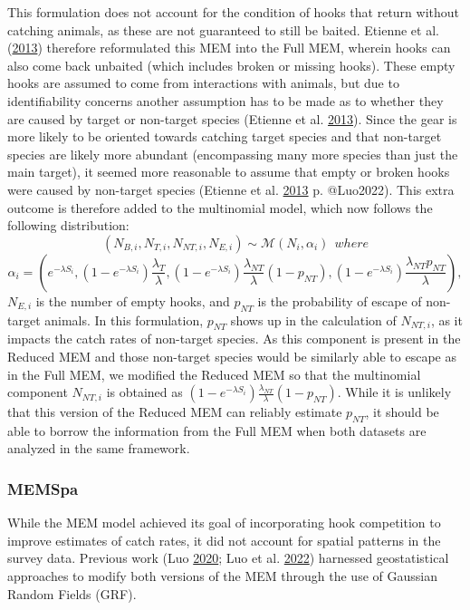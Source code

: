 \documentclass[12pt]{article}\usepackage[]{graphicx}\usepackage[]{color}
\begin{document}
This formulation does not account for the condition of hooks that return without catching animals, as these are not guaranteed to still be baited. Etienne et al. (\protect\hyperlink{ref-Etienne2013}{2013}) therefore reformulated this MEM into the Full MEM, wherein hooks can also come back unbaited (which includes broken or missing hooks). These empty hooks are assumed to come from interactions with animals, but due to identifiability concerns another assumption has to be made as to whether they are caused by target or non-target species (Etienne et al. \protect\hyperlink{ref-Etienne2013}{2013}). Since the gear is more likely to be oriented towards catching target species and that non-target species are likely more abundant (encompassing many more species than just the main target), it seemed more reasonable to assume that empty or broken hooks were caused by non-target species (Etienne et al. \protect\hyperlink{ref-Etienne2013}{2013} p. @Luo2022). This extra outcome is therefore added to the multinomial model, which now follows the following distribution:
\begin{equation}
(N_{B,i},N_{T,i},N_{NT,i},N_{E,i}) \sim \mathcal{M}(N_i,\alpha_i) \ \ where
\end{equation} \begin{equation}
\alpha_i = (e^{-\lambda S_i},(1-e^{-\lambda S_i})\frac{\lambda_T}{\lambda},(1-e^{-\lambda S_i})\frac{\lambda_{NT}}{\lambda}(1-p_{NT}),(1-e^{-\lambda S_i})\frac{\lambda_{NT}p_{NT}}{\lambda}),
\end{equation}
\(N_{E,i}\) is the number of empty hooks, and \(p_{NT}\) is the probability of escape of non-target animals. In this formulation, \(p_{NT}\) shows up in the calculation of \(N_{NT,i}\), as it impacts the catch rates of non-target species. As this component is present in the Reduced MEM and those non-target species would be similarly able to escape as in the Full MEM, we modified the Reduced MEM so that the multinomial component \(N_{NT,i}\) is obtained as \((1-e^{-\lambda S_i})\frac{\lambda_{NT}}{\lambda}(1-p_{NT})\). While it is unlikely that this version of the Reduced MEM can reliably estimate \(p_{NT}\), it should be able to borrow the information from the Full MEM when both datasets are analyzed in the same framework.

\hypertarget{memspa}{%
\subsubsection{MEMSpa}\label{memspa}}

While the MEM model achieved its goal of incorporating hook competition to improve estimates of catch rates, it did not account for spatial patterns in the survey data. Previous work (Luo \protect\hyperlink{ref-Luo2020}{2020}; Luo et al. \protect\hyperlink{ref-Luo2022}{2022}) harnessed geostatistical approaches to modify both versions of the MEM through the use of Gaussian Random Fields (GRF).
\end{document}
